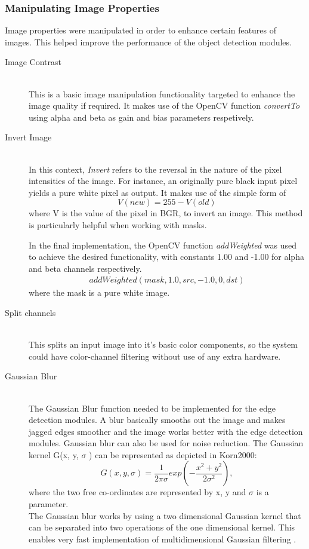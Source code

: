 \subsubsection{Manipulating Image Properties} 
Image properties were manipulated in order to enhance certain features of images. This helped improve the performance of the object detection modules.
\begin{description}
\item[Image Contrast]\hfill \\
This is a basic image manipulation functionality targeted to enhance the image quality if required.
It makes use of the OpenCV function \emph{convertTo} using alpha and beta as gain and bias parameters respetively.

\item[Invert Image]\hfill \\
In this context, \emph{Invert} refers to the reversal in the nature of the pixel intensities of the image.
For instance, an originally pure black input pixel yields a pure white pixel as output.
It makes use of the simple form of  
\begin{equation} V(new) = 255 - V(old)  
\end{equation} 
where V is the value of the pixel in BGR, to invert an image. 
This method is particularly helpful when working with masks.

In the final implementation, the OpenCV function \emph{addWeighted} was used to achieve the desired functionality, with constants 1.00 and -1.00 for alpha and beta channels respectively.
\begin{align*}
addWeighted(mask, 1.0, src, -1.0, 0, dst)
\end{align*}
where the mask is a pure white image.

\item[Split channels]\hfill \\
This splits an input image into it's basic color components, so the system could have color-channel filtering without use of any extra hardware.

\item[Gaussian Blur]\hfill \\
The Gaussian Blur function \cite{web:gaussianBlur}  needed to be implemented for the edge detection modules. A blur basically smooths out the image and makes jagged edges smoother and the image works better with the edge detection modules. Gaussian blur can also be used for noise reduction. The Gaussian kernel G(x, y, $\sigma$ ) can be represented as depicted in Korn2000:
\cite{korn2000mathematical}
\begin{equation}
G(x,y,\sigma)=\frac{1}{2\pi \sigma}exp(-\frac{x^2+y^2}{2\sigma ^2}),
\end{equation}
where the two free co-ordinates are represented by x, y and $\sigma$ is a parameter.
\\The Gaussian blur works by using a two dimensional Gaussian kernel that can be separated into two operations of the one dimensional kernel. This enables very fast implementation of multidimensional Gaussian filtering \cite{korn2000mathematical}.  


\end{description}
